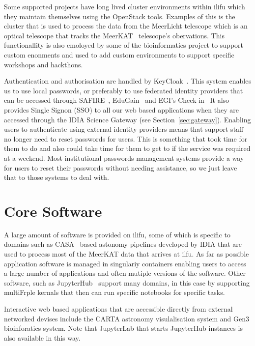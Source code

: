 \documentclass[12pt,twocolumn,a4paper]{article}
\begin{document}
Some supported projects have long lived cluster environments within ilifu which they maintain themselves using
the OpenStack tools.
Examples of this is the cluster that is used to process the data from the MeerLicht telescope which
is an optical telescope that tracks the MeerKAT~\cite{meerkat} telescope's obervations. This functionallity
is also emoloyed
by some of the bioinformatics project to support custom enonments and used to add
custom environments to support specific workshops and hackthons.

Authentication and authorisation are handled by KeyCloak~\cite{keycloak}. This system enables us 
to use local passwords,
or preferably to use federated identity providers that can be accessed through SAFIRE~\cite{SAFIRE}, 
EduGain~\cite{Edugain} and EGI's Check-in~\cite{egicheckin} It also provides Single Signon (SSO)
to all our 
web based applications when they are accessed through the 
IDIA Science Gateway (see Section~\ref{sec:gateway}).
Enabling users to authenticate using external identity providers means that support staff no longer need
to reset passwords for users. This is something that took time for them to do and also could take
time for them to get to if the service was required at a weekend. Most institutional passwords
management systems provide a way for users to reset their passwords without needing assistance,
so we just leave that to those systems to deal with.

\section{Core Software}
\label{sec:core_software}

A large amount of software is provided on ilifu, some of which is specific to domains such as CASA~\cite{CASA} based
astonomy pipelines developed by IDIA that are used to process most of the MeerKAT data that arrives
at ilfu. As far as possible application software is managed in singulariy containers enabling users
to access a large number of applications and often mutiple versions of the software. Other software, such
as JupyterHub~\cite{JupyterHub} support many domains, in this case by supporting multiFrple kernals that then can run 
specific notebooks for specific tasks.

Interactive web based applications that are accessible directly from external networked devises include
the CARTA astronomy visulalisation system and Gen3 bioinforatics system. Note that JupyterLab that starts
JupyterHub instances is also available in this way.
\end{document}
